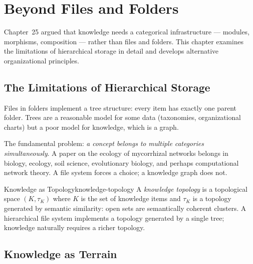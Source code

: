 \chapter{Beyond Files and Folders}



Chapter~25 argued that knowledge needs a categorical infrastructure —
modules, morphisms, composition — rather than files and folders.
This chapter examines the limitations of hierarchical storage in detail
and develops alternative organizational principles.

\section{The Limitations of Hierarchical Storage}

Files in folders implement a tree structure: every item has exactly one
parent folder. Trees are a reasonable model for some data (taxonomies,
organizational charts) but a poor model for knowledge, which is a graph.

The fundamental problem: \emph{a concept belongs to multiple categories
simultaneously}. A paper on the ecology of mycorrhizal networks belongs in
biology, ecology, soil science, evolutionary biology, and perhaps
computational network theory. A file system forces a choice; a knowledge
graph does not.

\begin{definition}{Knowledge as Topology}{knowledge-topology}
  A \emph{knowledge topology} is a topological space $(K, \tau_K)$ where
  $K$ is the set of knowledge items and $\tau_K$ is a topology generated
  by semantic similarity: open sets are semantically coherent clusters.
  A hierarchical file system implements a topology generated by a single
  tree; knowledge naturally requires a richer topology.
\end{definition}

\section{Knowledge as Terrain}


